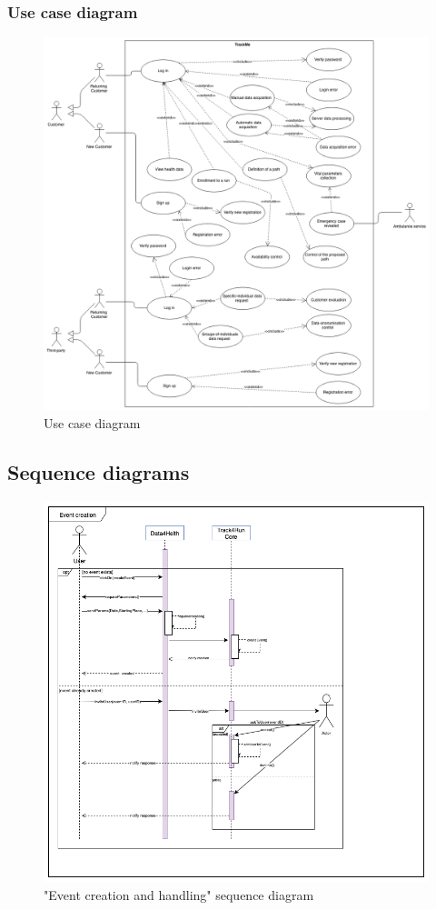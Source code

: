 \documentclass{article}
\begin{document}
\subsubsection{Use case diagram}
\begin{figure}[h!]
  \includegraphics[width=\textwidth]{Figures/UseCaseDiagram}
  \caption{Use case diagram}
\end{figure}
\newpage

\subsection{Sequence diagrams}
\begin{figure}[h!]
  \includegraphics[width=\textwidth]{Figures/Sequence-Event}
    \caption{"Event creation and handling" sequence diagram}
\end{figure}
\newpage
\end{document}

